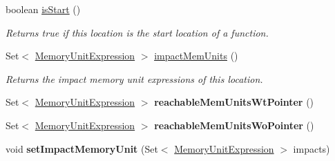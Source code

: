 \begin{DoxyCompactItemize}
\item 
boolean \hyperlink{interfaceedu_1_1udel_1_1cis_1_1vsl_1_1civl_1_1model_1_1IF_1_1location_1_1Location_a1767dc2e7af8e1b856e14b1020826ff9}{is\+Start} ()
\begin{DoxyCompactList}\small\item\em Returns true if this location is the start location of a function. \end{DoxyCompactList}\item 
Set$<$ \hyperlink{interfaceedu_1_1udel_1_1cis_1_1vsl_1_1civl_1_1model_1_1IF_1_1expression_1_1MemoryUnitExpression}{Memory\+Unit\+Expression} $>$ \hyperlink{interfaceedu_1_1udel_1_1cis_1_1vsl_1_1civl_1_1model_1_1IF_1_1location_1_1Location_adeaf78fc7a74e2286dcfae5053824430}{impact\+Mem\+Units} ()
\begin{DoxyCompactList}\small\item\em Returns the impact memory unit expressions of this location. \end{DoxyCompactList}\item 
\hypertarget{interfaceedu_1_1udel_1_1cis_1_1vsl_1_1civl_1_1model_1_1IF_1_1location_1_1Location_a5bbd8be1644777235bf64e85064b26d8}{}Set$<$ \hyperlink{interfaceedu_1_1udel_1_1cis_1_1vsl_1_1civl_1_1model_1_1IF_1_1expression_1_1MemoryUnitExpression}{Memory\+Unit\+Expression} $>$ {\bfseries reachable\+Mem\+Units\+Wt\+Pointer} ()\label{interfaceedu_1_1udel_1_1cis_1_1vsl_1_1civl_1_1model_1_1IF_1_1location_1_1Location_a5bbd8be1644777235bf64e85064b26d8}

\item 
\hypertarget{interfaceedu_1_1udel_1_1cis_1_1vsl_1_1civl_1_1model_1_1IF_1_1location_1_1Location_ab116db1ef0304f61675df62a8872748b}{}Set$<$ \hyperlink{interfaceedu_1_1udel_1_1cis_1_1vsl_1_1civl_1_1model_1_1IF_1_1expression_1_1MemoryUnitExpression}{Memory\+Unit\+Expression} $>$ {\bfseries reachable\+Mem\+Units\+Wo\+Pointer} ()\label{interfaceedu_1_1udel_1_1cis_1_1vsl_1_1civl_1_1model_1_1IF_1_1location_1_1Location_ab116db1ef0304f61675df62a8872748b}

\item 
\hypertarget{interfaceedu_1_1udel_1_1cis_1_1vsl_1_1civl_1_1model_1_1IF_1_1location_1_1Location_a0eb8adb7740ce98453438a5219f7cf87}{}void {\bfseries set\+Impact\+Memory\+Unit} (Set$<$ \hyperlink{interfaceedu_1_1udel_1_1cis_1_1vsl_1_1civl_1_1model_1_1IF_1_1expression_1_1MemoryUnitExpression}{Memory\+Unit\+Expression} $>$ impacts)\label{interfaceedu_1_1udel_1_1cis_1_1vsl_1_1civl_1_1model_1_1IF_1_1location_1_1Location_a0eb8adb7740ce98453438a5219f7cf87}


\end{DoxyCompactItemize}
